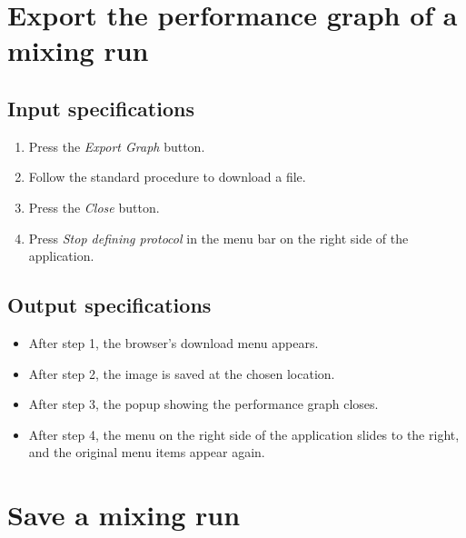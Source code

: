 \section{Export the performance graph of a mixing run}

\subsection*{Input specifications}
\begin{enumerate}
\item Press the \emph{Export Graph} button.
\item Follow the standard procedure to download a file.
\item Press the \emph{Close} button.
\item Press \emph{Stop defining protocol} in the menu bar on the right side of the application.
\end{enumerate}

\subsection*{Output specifications}
\begin{itemize}
\item After step 1, the browser's download menu appears.
\item After step 2, the image is saved at the chosen location.
\item After step 3, the popup showing the performance graph closes.
\item After step 4, the menu on the right side of the application slides to the right, and the original menu items appear again.
\end{itemize}

\section{Save a mixing run}

